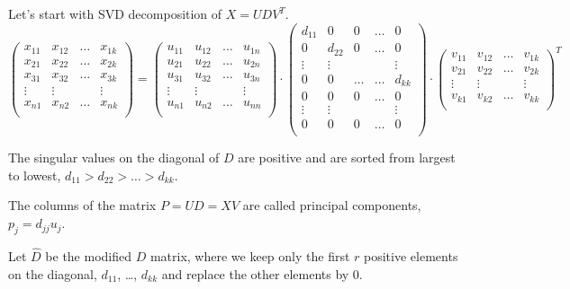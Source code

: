 \documentclass[12pt]{article}
\begin{document}
Let's start with SVD decomposition of $X = UDV^T$.
\[
\begin{pmatrix}
    x_{11} & x_{12} & \dots & x_{1k} \\
    x_{21} & x_{22} & \dots & x_{2k} \\
    x_{31} & x_{32} & \dots & x_{3k} \\
    \vdots & \vdots &    & \vdots \\
    x_{n1} & x_{n2} & \dots & x_{nk} \\
\end{pmatrix} =
\begin{pmatrix}
    u_{11} & u_{12} & \dots & u_{1n} \\
    u_{21} & u_{22} & \dots & u_{2n} \\
    u_{31} & u_{32} & \dots & u_{3n} \\
    \vdots & \vdots &    & \vdots \\
    u_{n1} & u_{n2} & \dots & u_{nn} \\
\end{pmatrix} \cdot 
\begin{pmatrix}
    d_{11} & 0 & 0 & \dots  & 0 \\
    0 & d_{22} & 0 & \dots  & 0 \\
    \vdots & \vdots &  &  & \vdots \\
    0 & 0 &  \dots & \dots  & d_{kk} \\
    0 & 0 & 0 & \dots  & 0 \\
    \vdots & \vdots &  &  & \vdots \\
    0 & 0 & 0 & \dots  & 0 \\
\end{pmatrix} \cdot
\begin{pmatrix}
    v_{11} & v_{12} & \dots & v_{1k} \\
    v_{21} & v_{22} & \dots & v_{2k} \\
    \vdots & \vdots &    & \vdots \\
    v_{k1} & v_{k2} & \dots & v_{kk} \\
\end{pmatrix}^T
\]

The singular values on the diagonal of $D$ are positive and are sorted from largest to lowest, $d_{11} > d_{22} > \dots > d_{kk}$.

The columns of the matrix $P = UD = XV$ are called principal components, $p_j = d_{jj} u_j$.

Let $\hat D$ be the modified $D$ matrix, where we keep only the first $r$ positive elements on the diagonal, $d_{11}$, \dots, $d_{kk}$ 
and replace the other elements by $0$.
\end{document}
